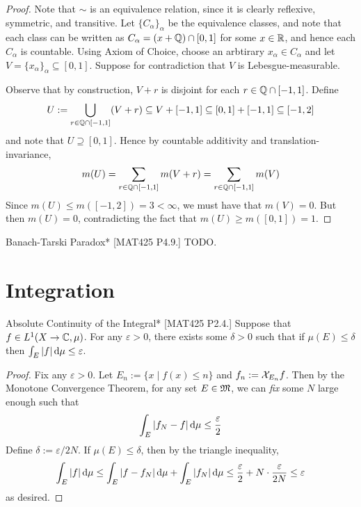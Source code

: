 \begin{proof}
    Note that \(\sim\) is an equivalence relation, since it is clearly reflexive, symmetric, and transitive. Let \(\{C_\alpha\}_\alpha\) be the equivalence classes, and note that each class can be written as \(C_\alpha = (x + \mathbb{Q}) \cap [0,1]\) for some \(x \in \mathbb{R}\), and hence each \(C_\alpha\) is countable. Using Axiom of Choice, choose an arbtirary \(x_\alpha \in C_\alpha\) and let \(V = \{x_\alpha\}_\alpha \subseteq [0,1]\). Suppose for contradiction that \(V\) is Lebesgue-measurable. 
    \stdvspace

    Observe that by construction, \(V+r\) is disjoint for each \(r \in \mathbb{Q} \cap [-1, 1]\). Define 
    \[
        U := \bigcup_{r \in \mathbb{Q} \cap [-1, 1]} (V + r) \subseteq V + [-1, 1] \subseteq [0,1] + [-1,1] \subseteq [-1, 2]
    \]
    and note that \(U \supseteq [0,1]\). Hence by countable additivity and translation-invariance, 
    \[
        m(U) = \sum_{r \in \mathbb{Q} \cap [-1,1]} m(V+r) = \sum_{r \in \mathbb{Q} \cap [-1,1]} m(V)
    \]
    Since \(m(U) \leq m([-1,2]) = 3 < \infty\), we must have that \(m(V) = 0\). But then \(m(U) = 0\), contradicting the fact that \(m(U) \geq m([0,1]) = 1\). 
\end{proof}

\begin{problem}{Banach-Tarski Paradox}*
    [MAT425 P4.9.] TODO. 
\end{problem}

\newpage
\section{Integration}

\begin{problem}{Absolute Continuity of the Integral}*
    [MAT425 P2.4.] Suppose that \(f \in L^1(X \to \mathbb{C}, \mu)\). For any \(\varepsilon > 0\), there exists some \(\delta > 0\) such that if \(\mu(E) \leq \delta\) then \(\int_E |f| \, \mathrm{d}\mu \leq \varepsilon\). 
\end{problem}

\begin{proof}
    Fix any \(\varepsilon > 0\). Let \(E_n := \{x \mid f(x) \leq n\}\) and \(f_n := \mathcal{X}_{E_n}f\). Then by the Monotone Convergence Theorem, for any set \(E \in \mathfrak{M}\), we can \emph{fix} some \(N\) large enough such that
    \[
    \int_E |f_N - f| \, \mathrm{d}\mu \leq \frac{\varepsilon}{2}
    \]
    Define \(\delta := \varepsilon / 2N\). If \(\mu(E) \leq \delta\), then by the triangle inequality, 
    \[
    \int_E |f| \, \mathrm{d}\mu 
    \leq \int_E |f - f_N| \, \mathrm{d}\mu + \int_E |f_N| \, \mathrm{d}\mu
    \leq \frac{\varepsilon}{2} + N \cdot \frac{\varepsilon}{2N}
    \leq \varepsilon
    \]
    as desired. 
\end{proof}

